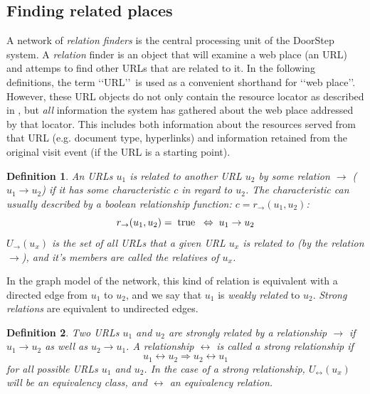 \documentclass[a4paper]{danarticle}
\newtheorem{definition}{Definition}
\theoremstyle{remark}
\begin{document}
     \subsection{Finding related places} 
       A network of \textit{relation finders} is the central processing unit of 
       the DoorStep system. A \textit{relation} finder is an object that will 
       examine a web place (an URL) and attemps to find other URLs that are 
       related to it. In the following definitions, the term \lq\lq URL\rq\rq\ 
       is used as a convenient shorthand for \lq\lq web place\rq\rq . However, 
       these URL objects do not only contain the resource locator as described 
       in \cite{url}, but \emph{all} information the system has gathered about 
       the web place addressed by that locator. This includes both information 
       about  the resources served from that URL (e.g. document type, hyperlinks) 
       and information retained from the original visit event (if the URL is a 
       starting point).
       \begin{definition}
       An URLs $ u_1 $ is related to another URL $ u_2 $ by some relation 
       $ \rightarrow $
       ($ u_1 \rightarrow u_2 $) if it has some characteristic $ c $ in regard
       to $ u_2 $. The characteristic can usually described by a boolean
       relationship function: $ c = r_{\rightarrow}(u_1, u_2) $:
       \[
         r_{\rightarrow}(u_1, u_2) = \hspace{1mm} \mbox{true} \hspace{2mm} 
	     \Leftrightarrow \hspace{1mm} u_1 \rightarrow u_2
       \]
       $ U_{\rightarrow}(u_x) $ is the set of all URLs that a given URL $ u_x $ 
       is related to (by the relation $ \rightarrow $), and it's members are 
       called the \emph{relatives} of $ u_x $.
       \end{definition}
       In the graph model of the network, this kind of relation is equivalent
       with a directed edge from $ u_1 $ to $ u_2 $, and we say that $ u_1 $ is
       \textit{weakly related} to $ u_2 $. \textit{Strong relations} are
       equivalent to undirected edges.
       \begin{definition}
       Two URLs $ u_1 $ and $ u_2 $ are \emph{strongly related} by a relationship
       $ \rightarrow $ if $ u_1 \rightarrow u_2 $ as well as 
       $ u_2 \rightarrow u_1 $. A relationship $ \leftrightarrow $ is called a
       \emph{strong} relationship if
       \[
         u_1 \leftrightarrow u_2 \Rightarrow u_2 \leftrightarrow u_1 
       \]
       for all possible URLs $ u_1 $ and $ u_2 $. In the case of a strong 
       relationship, $ U_{\leftrightarrow}(u_x) $ will be an equivalency 
       class, and $ \leftrightarrow $ an equivalency relation.
       \end{definition}
\end{document}
